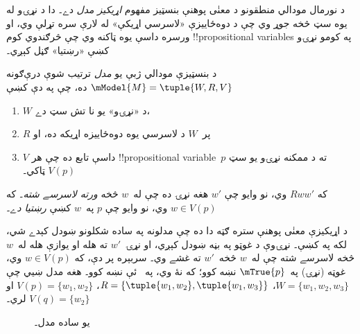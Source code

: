\documentclass[../../../include/open-logic-section]{subfiles}
\begin{document}


د نورمال مودالي منطقونو د معنٰی پوهنې بنسټيز مفهوم \emph{اړيکيز
مدل} دے۔ دا د نړۍو له يوه سټ څخه جوړ وي چې د دوه‌ځاييزې «لاسرسي
اړيکې» له لارې سره تړلې وي، او ورسره داسې يوه ټاکنه وي چې څرګندوي
کوم !!{propositional variable}s په کومو نړۍو کښې «رښتيا» ګڼل کېږي۔

\begin{defn}
  د بنسټيزې مودالي ژبې يو \emph{مدل} ترتيب شوې درې‌ګونه $\mModel{M}
  = \tuple{W, R, V}$ ده، چې په دې کښې
  \begin{enumerate}
  \item $W$ د «نړۍو» يو نا تش سټ دے،
  \item $R$ پر~$W$ د لاسرسي يوه دوه‌ځاييزه اړيکه ده، او
  \item $V$ داسې تابع ده چې هر !!{propositional
    variable}~$p$ ته د ممکنه نړۍو يو سټ $V(p)$ ټاکي۔
  \end{enumerate}
  که $Rww'$ وي، نو وايو چې $w'$ هغه نړۍ ده چې له~$w$ څخه \emph{ورته لاسرسے
    شته}۔ که $w \in V(p)$ وي، نو وايو چې $p$ په~$w$ کښې
  \emph{رښتيا دے}۔
\end{defn}

د اړيکيزې معنٰی پوهنې ستره ګټه دا ده چې مدلونه په ساده شکلونو
ښودل کېدے شي، لکه په  کښې۔ نړۍوې د غوټو په بڼه
ښودل کېږي، او نړۍ~$w'$ ته هله او يوازې هله له~$w$ څخه لاسرسے شته
چې له~$w$ څخه~$w'$ ته غشے وي۔ سربېره پر دې، که $w \in V(p)$ وي،
غوټه (نړۍ) په~$\mTrue{p}$ نښه کوو؛ که نۀ وي، په~ ئې
نښه کوو۔  هغه مدل ښيي چې
$W = \{w_1, w_2, w_3\}$، $R = \{\tuple{w_1, w_2},\tuple{w_1,
  w_3}\}$، $V(p) = \{w_1, w_2\}$ او $V(q) = \{w_2\}$ لري۔

\begin{figure}
  \begin{center}
  \end{center}
  \caption{يو ساده مدل۔}
\end{figure}
\end{document}
